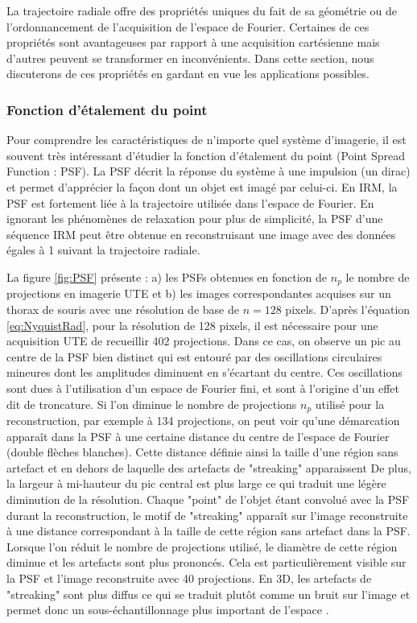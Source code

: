 La trajectoire radiale offre des propriétés uniques du fait de sa géométrie ou de l'ordonnancement de l'acquisition de l'espace de Fourier. Certaines de ces propriétés sont avantageuses par rapport à une acquisition cartésienne mais d'autres peuvent se transformer en inconvénients. Dans cette section, nous discuterons de ces propriétés en gardant en vue les applications possibles.
 
\subsubsection{Fonction d'étalement du point}

Pour comprendre les caractéristiques de n'importe quel système d'imagerie, il est souvent très intéressant d'étudier la fonction d'étalement du point (Point Spread Function : PSF). La PSF décrit la réponse du système à une impulsion (un dirac) et permet d'apprécier la façon dont un objet est imagé par celui-ci. En IRM, la PSF est fortement liée à la trajectoire utilisée dans l'espace de Fourier. En ignorant les phénomènes de relaxation pour plus de simplicité, la PSF d'une séquence IRM peut être obtenue en reconstruisant une image avec des données égales à 1 suivant la trajectoire radiale.

La figure \ref{fig:PSF} présente : a) les PSFs obtenues en fonction de $n_p$ le nombre de projections en imagerie UTE et b) les images correspondantes acquises sur un thorax de souris avec une résolution de base de $n = 128$ pixels. D'après l'équation \ref{eq:NyquistRad}, pour la résolution de 128 pixels, il est nécessaire pour une acquisition UTE de recueillir 402 projections. Dans ce cas, on observe un pic au centre de la PSF bien distinct qui est entouré par des oscillations circulaires mineures dont les amplitudes diminuent en s'écartant du centre. Ces oscillations sont dues à l'utilisation d'un espace de Fourier fini, et sont à l'origine d'un effet dit de troncature. Si l'on diminue le nombre de projections $n_p$ utilisé pour la reconstruction, par exemple à 134 projections, on peut voir qu'une démarcation apparaît dans la PSF à une certaine distance du centre de l'espace de Fourier (double flèches blanches). Cette distance définie ainsi la taille d'une région sans artefact \cite{Scheffler:1998fk} et en dehors de laquelle des artefacts de "streaking" apparaissent De plus, la largeur à mi-hauteur du pic central est plus large ce qui traduit une légère diminution de la résolution. Chaque "point" de l'objet étant convolué avec la PSF durant la reconstruction, le motif de "streaking" apparaît sur l'image reconstruite à une distance correspondant à la taille de cette région sans artefact dans la PSF. Lorsque l'on réduit le nombre de projections utilisé, le diamètre de cette région diminue et les artefacts sont plus prononcés. Cela est particulièrement visible sur la PSF et l'image reconstruite avec 40 projections.
En 3D, les artefacts de "streaking" sont plus diffus ce qui se traduit plutôt comme un bruit sur l'image et permet donc un sous-échantillonnage plus important de l'espace \cite{Gu:2005aa}.

